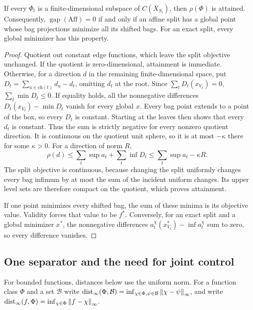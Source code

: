 \begin{proposition}
\label{prop:consistency-attainment}
If every $\Phi_t$ is a finite-dimensional subspace of
$C(X_{S_t})$, then $\rho(\Phi)$ is attained.
Consequently, $\operatorname{gap}(\mathrm{Aff})=0$ if and only if an
affine split has a global point whose bag projections minimize all its
shifted bags.  For an exact split, every global minimizer has this property.
\end{proposition}

\begin{proof}
Quotient out constant edge functions, which leave the split objective
unchanged.  If the quotient is zero-dimensional, attainment is immediate.
Otherwise, for a direction $d$ in the remaining finite-dimensional
space, put $D_t=\sum_{u\in\mathrm{ch}(t)}d_u-d_t$, omitting $d_t$ at the
root.  Since $\sum_tD_t(x_{V_t})=0$,
$\sum_t\min D_t\le0$.
If equality holds, all the nonnegative differences
$D_t(x_{V_t})-\min D_t$ vanish for every global $x$.
Every bag point extends to a point of the box, so every $D_t$ is constant.
Starting at the leaves then shows that every $d_t$ is constant.
Thus the sum is strictly negative for every nonzero quotient direction.
It is continuous on the quotient unit sphere, so it is at most
$-\kappa$ there for some $\kappa>0$.  For a direction of norm $R$,
\[
 \rho(d)\le\sum_t\sup a_t+\sum_t\inf D_t
 \le\sum_t\sup a_t-\kappa R.
\]
The split objective is continuous, because changing the split uniformly
changes every bag infimum by at most the sum of the incident uniform
changes.  Its upper level sets are therefore compact on the quotient,
which proves attainment.

If one point minimizes every shifted bag, the sum of these minima is
its objective value.  Validity forces that value to be $f^*$.
Conversely, for an exact split and a global minimizer $x^*$, the
nonnegative differences $a_t^\chi(x^*_{V_t})-\inf a_t^\chi$ sum to zero,
so every difference vanishes.
\end{proof}

\subsection{One separator and the need for joint control}

For bounded functions, distances below use the uniform norm.  For a
function class $\Phi$ and a set $\mathcal B$ write
$\operatorname{dist}_\infty(\Phi,\mathcal B)=\inf_{\chi\in\Phi,\psi\in\mathcal B}
\left\lVert \chi-\psi\right\rVert_\infty$, and write
$\operatorname{dist}_\infty(f,\Phi)=\inf_{\chi\in\Phi}\left\lVert f-\chi\right\rVert_\infty$.

